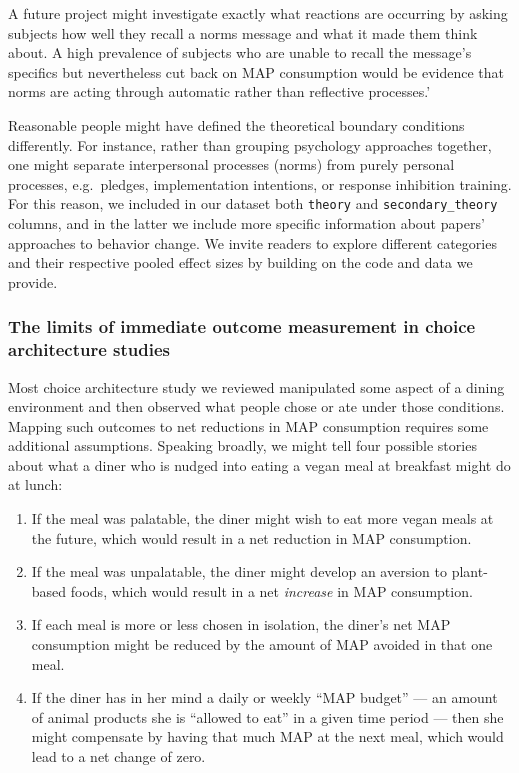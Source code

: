 \documentclass[sn-nature,referee,pdflatex]{sn-jnl}
\providecommand{\tightlist}{%
  \setlength{\itemsep}{0pt}\setlength{\parskip}{0pt}}
\begin{document}
A future project might investigate exactly what reactions are occurring
by asking subjects how well they recall a norms message and what it made
them think about. A high prevalence of subjects who are unable to recall
the message's specifics but nevertheless cut back on MAP consumption
would be evidence that norms are acting through automatic rather than
reflective processes.'

Reasonable people might have defined the theoretical boundary conditions
differently. For instance, rather than grouping psychology approaches
together, one might separate interpersonal processes (norms) from purely
personal processes, e.g.~pledges, implementation intentions, or response
inhibition training. For this reason, we included in our dataset both
\texttt{theory} and \texttt{secondary\_theory} columns, and in the
latter we include more specific information about papers' approaches to
behavior change. We invite readers to explore different categories and
their respective pooled effect sizes by building on the code and data we
provide.

\subsubsection{The limits of immediate outcome measurement in choice
architecture
studies}\label{the-limits-of-immediate-outcome-measurement-in-choice-architecture-studies}

Most choice architecture study we reviewed manipulated some aspect of a
dining environment and then observed what people chose or ate under
those conditions. Mapping such outcomes to net reductions in MAP
consumption requires some additional assumptions. Speaking broadly, we
might tell four possible stories about what a diner who is nudged into
eating a vegan meal at breakfast might do at lunch:

\begin{enumerate}
\def\labelenumi{\arabic{enumi}.}
\tightlist
\item
  If the meal was palatable, the diner might wish to eat more vegan
  meals at the future, which would result in a net reduction in MAP
  consumption.
\item
  If the meal was unpalatable, the diner might develop an aversion to
  plant-based foods, which would result in a net \emph{increase} in MAP
  consumption.
\item
  If each meal is more or less chosen in isolation, the diner's net MAP
  consumption might be reduced by the amount of MAP avoided in that one
  meal.
\item
  If the diner has in her mind a daily or weekly ``MAP budget'' --- an
  amount of animal products she is ``allowed to eat'' in a given time
  period --- then she might compensate by having that much MAP at the
  next meal, which would lead to a net change of zero.
\end{enumerate}
\end{document}
